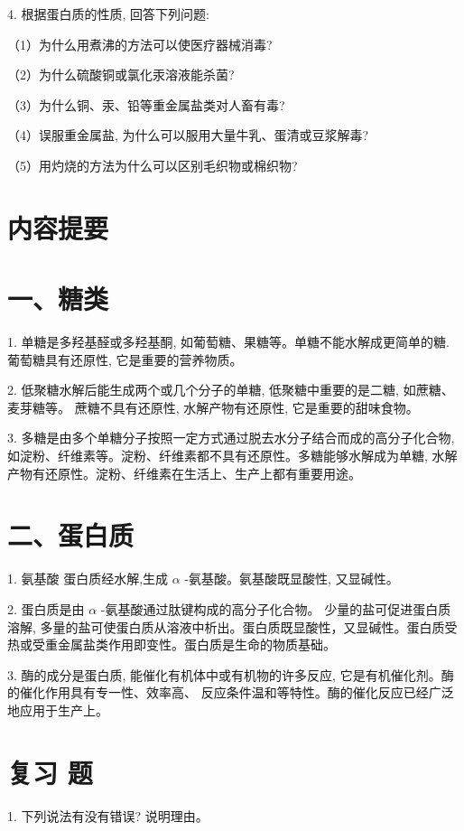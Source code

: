 \documentclass[10pt]{article}
\begin{document}
4. 根据蛋白质的性质, 回答下列问题:

（1）为什么用煮沸的方法可以使医疗器械消毒?

（2）为什么硫酸铜或氯化汞溶液能杀菌?

（3）为什么铜、汞、铅等重金属盐类对人畜有毒?

（4）误服重金属盐, 为什么可以服用大量牛乳、蛋清或豆浆解毒?

（5）用灼烧的方法为什么可以区别毛织物或棉织物?

\section*{内容提要}

\section*{一、糖类}

1. 单糖是多羟基醛或多羟基酮, 如葡萄糖、果糖等。单糖不能水解成更简单的糖. 葡萄糖具有还原性, 它是重要的营养物质。

2. 低聚糖水解后能生成两个或几个分子的单糖, 低聚糖中重要的是二糖, 如蔗糖、麦芽糖等。 蔗糖不具有还原性, 水解产物有还原性, 它是重要的甜味食物。

3. 多糖是由多个单糖分子按照一定方式通过脱去水分子结合而成的高分子化合物, 如淀粉、纤维素等。淀粉、纤维素都不具有还原性。多糖能够水解成为单糖, 水解产物有还原性。淀粉、纤维素在生活上、生产上都有重要用途。

\section*{二、蛋白质}

1. 氨基酸 蛋白质经水解,生成 \(\alpha\) -氨基酸。氨基酸既显酸性, 又显碱性。

2. 蛋白质是由 \(\alpha\) -氨基酸通过肽键构成的高分子化合物。 少量的盐可促进蛋白质溶解, 多量的盐可使蛋白质从溶液中析出。蛋白质既显酸性，又显碱性。蛋白质受热或受重金属盐类作用即变性。蛋白质是生命的物质基础。

3. 酶的成分是蛋白质, 能催化有机体中或有机物的许多反应, 它是有机催化剂。酶的催化作用具有专一性、效率高、 反应条件温和等特性。酶的催化反应已经广泛地应用于生产上。

\section*{复习 题}

1. 下列说法有没有错误? 说明理由。
\end{document}
